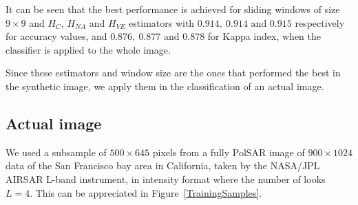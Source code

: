 \documentclass[journal]{IEEEtran}
\begin{document}

It can be seen that the best performance is achieved for sliding windows of size $9 \times 9$ and $H_C$, $H_{NA}$ and $H_{VE}$ estimators with $0.914, \ 0.914 \text{ and } 0.915$ respectively for accuracy values,  and  $0.876, \ 0.877 \text{ and } 0.878$ for Kappa index, when the classifier is applied to the whole image.

Since these estimators and window size are the ones that performed the best in the synthetic image, we apply them in the classification of an actual image.

\subsection{Actual image}

We used a subsample of $500 \times 645$ pixels from a fully PolSAR image of $900 \times 1024$ data of the San Francisco bay area in California, taken by the NASA/JPL AIRSAR L-band instrument, in intensity format where the number of looks $L=4$. This can be appreciated in Figure~\ref{TrainingSamples}.
\end{document}
